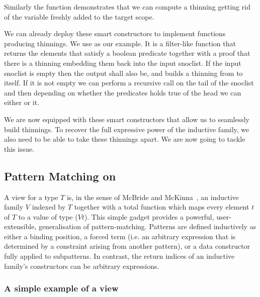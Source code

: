 
Similarly the  function demonstrates that we can compute a
thinning getting rid of the variable  freshly added to the target
scope.


We can already deploy these smart constructors to implement functions producing
thinnings. We use  as our example. It is a filter-like
function that returns the elements that satisfy a boolean predicate together with
a proof that there is a thinning embedding them back into the input snoclist.
%
If the input snoclist is empty then the output shall also be, and
 builds a thinning from \IdrisData{[<]} to itself.
%
If it is not empty we can perform a recursive call on the tail of the snoclist
and then depending on whether the predicates holds true of the head we can either
 or  it.


We are now equipped with these smart constructors that allow us to seamlessly
build thinnings.
%
To recover the full expressive power of the inductive family, we also need to
be able to take these thinnings apart. We are now going to tackle this issue.

\subsection{Pattern Matching on }

A view for a type $T$ is, in the sense of McBride and
McKinna~\cite{DBLP:journals/jfp/McBrideM04}, an inductive family
$V$ indexed by $T$ together with a total function which maps every element $t$ of $T$
to a value of type ($V t$).
%
This simple gadget provides a powerful, user-extensible, generalisation of
pattern-matching.
%
Patterns are defined inductively as either a binding position, a forced term
(i.e. an arbitrary expression that is determined by a constraint arising from
another pattern), or a data constructor fully applied to subpatterns.
%
In contrast, the return indices of an inductive family's constructors can be
arbitrary expressions.

\subsubsection{A simple example of a view}

